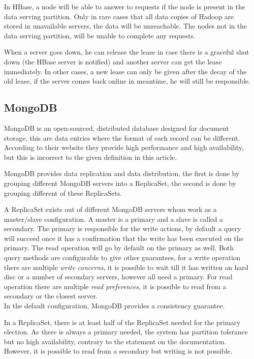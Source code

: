 \documentclass[final,5p,times]{elsarticle}
\begin{document}
In HBase, a node will be able to answer to requests if the node is present in the data serving partition. Only in rare cases that all data copies of Hadoop are stored in unavailable servers, the data will be unreachable. The nodes not in the data serving partition, will be unable to complete any requests. 

When a server goes down, he can release the lease in case there is a graceful shut down (the HBase server is notified) and another server can get the lease immediately. In other cases, a new lease can only be given after the decay of the old lease, if the server comes back online in meantime, he will still be responsible. 

\subsection{MongoDB}
MongoDB\cite{mongodb-doc} is an open-sourced, distributed database designed for document storage, this are data entries where the format of each record can be different. According to their website they provide high performance and high availability, but this is incorrect to the given definition in this article. 

MongoDB provides data replication and data distribution, the first is done by grouping different MongoDB servers into a ReplicaSet, the second is done by grouping different of these ReplicaSets. 

A ReplicaSet exists out of different MongoDB servers whom work as a master/slave configuration. A master is a primary and a slave is called a secondary. The primary is responsible for the write actions, by default a query will succeed once it has a confirmation that the write has been executed on the primary. The read operation will go by default on the primary as well. Both query methods are configurable to give other guarantees, for a write operation there are multiple \textit{write concerns}, it is possible to wait till it has written on hard disc or a number of secondary servers, however all need a primary. For read operation there are multiple \textit{read preferences}, it is possible to read from a secondary or the closest server. \\ 
In the default configuration, MongoDB provides a consistency guarantee.

In a ReplicaSet, there is at least half of the ReplicaSet needed for the primary election. As there is always a primary needed, the system has partition tolerance but no high availability, contrary to the statement on the documentation. However, it is possible to read from a secondary but writing is not possible.
\end{document}
